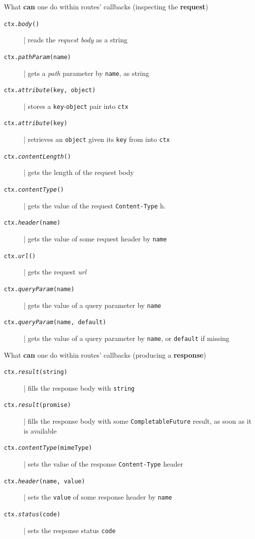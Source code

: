 \documentclass[presentation]{beamer}\mode<presentation>{\usetheme{AMSBolognaFC}}
\begin{document}
\begin{frame}[allowframebreaks]
    \begin{block}{What \textbf{can} one do within routes' callbacks (inspecting the \textbf{request})}
        \begin{description}
            \item[\texttt{ctx.\textit{body}()}] | reads the \emph{request body} as a string
            \item[\texttt{ctx.\textit{pathParam}(name)}] | gets a \emph{path} parameter by \texttt{name}, as string
            \item[\texttt{ctx.\textit{attribute}(key, object)}] | stores a \texttt{key}-\texttt{object} pair into \texttt{ctx}
            \item[\texttt{ctx.\textit{attribute}(key)}] | retrieves an \texttt{object} given its \texttt{key} from into \texttt{ctx}
            \item[\texttt{ctx.\textit{contentLength}()}] | gets the length of the request body
            \item[\texttt{ctx.\textit{contentType}()}] | gets the value of the request \texttt{Content-Type} h.
            \item[\texttt{ctx.\textit{header}(name)}] | gets the value of some request header by \texttt{name}
            \item[\texttt{ctx.\textit{url}()}] | gets the request \emph{url}
            \item[\texttt{ctx.\textit{queryParam}(name)}] | gets the value of a query parameter by \texttt{name}
            \item[\texttt{ctx.\textit{queryParam}(name, default)}] | gets the value of a query parameter by \texttt{name}, or \texttt{default} if missing
        \end{description}
    \end{block}

    \framebreak

    \begin{block}{What \textbf{can} one do within routes' callbacks (producing a \textbf{response})}
        \begin{description}
            \item[\texttt{ctx.\textit{result}(string)}] | fills the response body with \texttt{string}
            \item[\texttt{ctx.\textit{result}(promise)}] | fills the response body with some \texttt{CompletableFuture} result, as soon as it is available
            \item[\texttt{ctx.\textit{contentType}(mimeType)}] | sets the value of the response \texttt{Content-Type} header
            \item[\texttt{ctx.\textit{header}(name, value)}] | sets the \texttt{value} of some response header by \texttt{name}
            \item[\texttt{ctx.\textit{status}(code)}] | sets the response status \texttt{code}
        \end{description}
    \end{block}


\end{frame}
\end{document}
